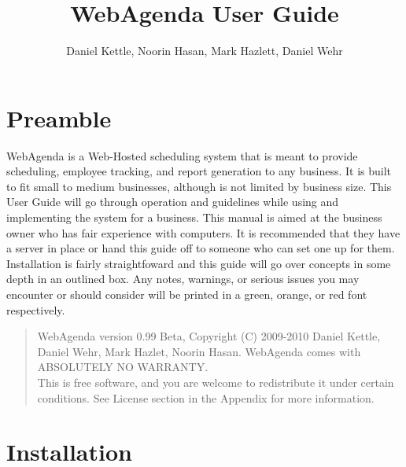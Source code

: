 \documentclass[a4paper,10pt]{report}
\title{WebAgenda User Guide}
\author{Daniel Kettle, Noorin Hasan, Mark Hazlett, Daniel Wehr}
\begin{document}
\maketitle
\tableofcontents
\setcounter{chapter}{-1}
\chapter{Preamble}

\par \noindent \hspace*{1cm} WebAgenda is a Web-Hosted scheduling system that is meant to provide scheduling, employee tracking, and report generation to any business. It is built to fit small to medium businesses, although is not limited by business size.  This User Guide will go through operation and guidelines while using and implementing the system for a business. This manual is aimed at the business owner who has fair experience with computers. It is recommended that they have a server in place or hand this guide off to someone who can set one up for them. Installation is fairly straightfoward and this guide will go over concepts in some depth in an outlined box. Any notes, warnings, or serious issues you may encounter or should consider will be printed in a green, orange, or red font respectively. 

\begin{quote}
WebAgenda version 0.99 Beta, Copyright (C) 2009-2010 Daniel Kettle, Daniel Wehr, Mark Hazlet, Noorin Hasan.
WebAgenda comes with ABSOLUTELY NO WARRANTY. \\
This is free software, and you are welcome to redistribute it under certain conditions. See License section in the Appendix for more information.
\end{quote}



\chapter{Installation}
\end{document}
